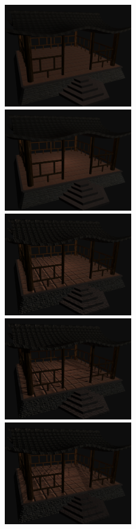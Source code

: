 \documentclass{acmsiggraph}                     %
\begin{document}
\begin{figure}[t]
  \centering
  \includegraphics[width=2.2in]{rhan_shrine_0}
  \includegraphics[width=2.2in]{rhan_shrine_1_per_pixel_lighting}
  \includegraphics[width=2.2in]{rhan_shrine_2_bump_mapping}
  \includegraphics[width=2.2in]{rhan_shrine_3_shadow_1st}
  \includegraphics[width=2.2in]{rhan_shrine_4_shadow_2nd}

\end{figure}
\end{document}
